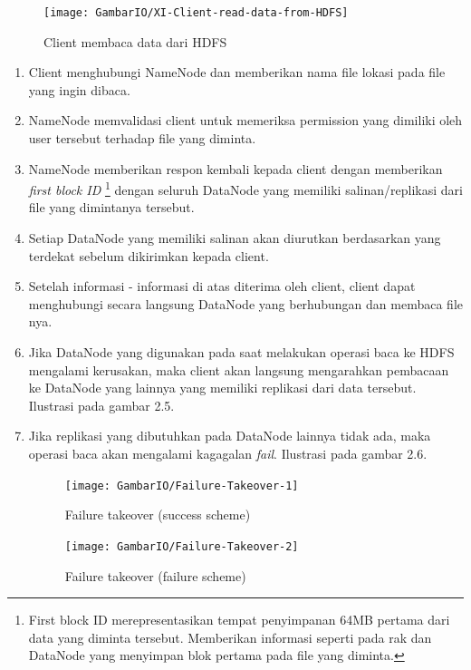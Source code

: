			\begin{figure}[ht]
			\centering
			\texttt{[image: GambarIO/XI-Client-read-data-from-HDFS]}
			\caption[Client membaca data dari HDFS]{Client membaca data dari HDFS}
			\label{fig:XI-Client-read-data-from-HDFS}
			\end{figure}
			
			
			\begin{enumerate}
				\item Client menghubungi NameNode dan memberikan nama file lokasi pada file yang ingin dibaca.
				\item NameNode memvalidasi client untuk memeriksa permission yang dimiliki oleh user tersebut terhadap file yang diminta. 
				\item NameNode memberikan respon kembali kepada client dengan memberikan \textit{first block ID} \footnote{First block ID merepresentasikan tempat penyimpanan 64MB pertama dari data yang diminta tersebut. Memberikan informasi seperti pada rak dan DataNode yang menyimpan blok pertama pada file yang diminta.} dengan seluruh DataNode yang memiliki salinan/replikasi dari file yang dimintanya tersebut.
				\item Setiap DataNode yang memiliki salinan akan diurutkan berdasarkan yang terdekat sebelum dikirimkan kepada client.
				\item Setelah informasi - informasi di atas diterima oleh client, client dapat menghubungi secara langsung DataNode yang berhubungan dan membaca file nya.
				\item Jika DataNode yang digunakan pada saat melakukan operasi baca ke HDFS mengalami kerusakan, maka client akan langsung mengarahkan pembacaan ke DataNode yang lainnya yang memiliki replikasi dari data tersebut. Ilustrasi pada gambar 2.5.
				\item Jika replikasi yang dibutuhkan pada DataNode lainnya tidak ada, maka operasi baca akan mengalami kagagalan \textit{fail}. Ilustrasi pada gambar 2.6.
				
			\begin{figure}[h]
				\centering
				\texttt{[image: GambarIO/Failure-Takeover-1]}
				\caption[Failure takeover 1]{Failure takeover (success scheme)}
				\label{fig:Failure takeover (success scheme)}
			\end{figure}
			
			\begin{figure}[h]
				\centering
				\texttt{[image: GambarIO/Failure-Takeover-2]}
				\caption[Failure takeover 1]{Failure takeover (failure scheme)}
				\label{fig:Failure takeover (failure scheme)}
			\end{figure}
				
			\end{enumerate}		
